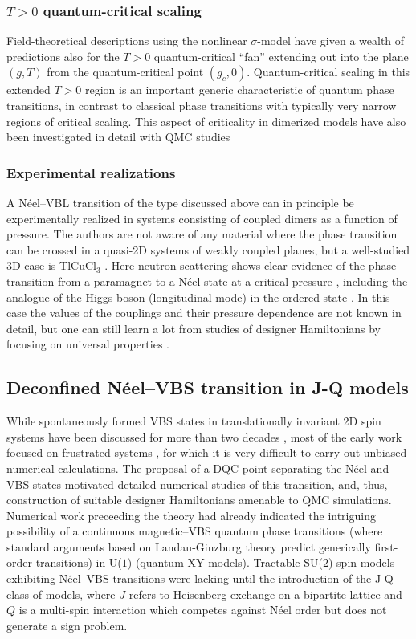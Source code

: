 \documentclass[range]{ar2e}
\begin{document}
\subsubsection{$T>0$ quantum-critical scaling}
Field-theoretical descriptions using the nonlinear $\sigma$-model \cite{Haldane83,Chakravarty89,Chubukov94} have given a wealth of 
predictions also for the $T>0$ quantum-critical ``fan'' extending out into the plane $(g,T)$  from the quantum-critical point $(g_c,0)$. Quantum-critical
scaling in this extended $T>0$ region is an important generic characteristic of quantum phase transitions, in contrast to classical phase transitions with typically 
very narrow regions of critical scaling. This aspect of criticality in dimerized models have also been investigated in detail with QMC 
studies \cite{Sandvik95,Brenig06,Sandvik11a}

\subsubsection{Experimental realizations}
A N\'eel--VBL transition of the type discussed above can in principle be experimentally realized in systems consisting of coupled dimers as a function 
of pressure. The authors are not aware of any material where the phase transition can be crossed in a quasi-2D systems of weakly 
coupled planes, but a well-studied 3D case is TlCuCl$_3$ \cite{Cavadini01,Ruegg04}. Here neutron scattering shows clear evidence of the phase transition 
from a paramagnet to a N\'eel state at a critical pressure \cite{Ruegg08}, including the analogue of the Higgs boson (longitudinal mode) in the ordered 
state \cite{Sachdev09}. In this case the values of the couplings and their pressure dependence are not known in detail, but one can still learn a lot from 
studies of designer Hamiltonians by focusing on universal properties \cite{Troyer97,Yao07,Jin12,Oitmaa11}.

\subsection{Deconfined N\'eel--VBS transition in J-Q models}
\label{ss:jq2}
While spontaneously formed VBS states in translationally invariant 2D spin systems have been discussed for more than two decades \cite{Chandra88,Dagotto89,Read89},
most of the early work focused on frustrated systems \cite{Dagotto89,Schulz96,Capriotti01}, for which it is very difficult to carry out unbiased numerical 
calculations. The proposal of a DQC point separating the N\'eel and VBS states motivated detailed numerical studies of this transition, and, thus, construction 
of suitable designer 
Hamiltonians amenable to QMC simulations. Numerical work preceeding the theory \cite{Sandvik02} had already indicated the intriguing possibility of 
a continuous magnetic--VBS quantum phase transitions (where standard arguments based on Landau-Ginzburg theory predict generically first-order transitions) in
U($1$) (quantum XY models). Tractable SU($2$) spin models exhibiting N\'eel--VBS transitions were lacking until the introduction of the J-Q class of models, 
where $J$ refers to Heisenberg exchange on a bipartite lattice and $Q$ is a multi-spin interaction which competes against N\'eel order but does not generate 
a sign problem. 
\end{document}
